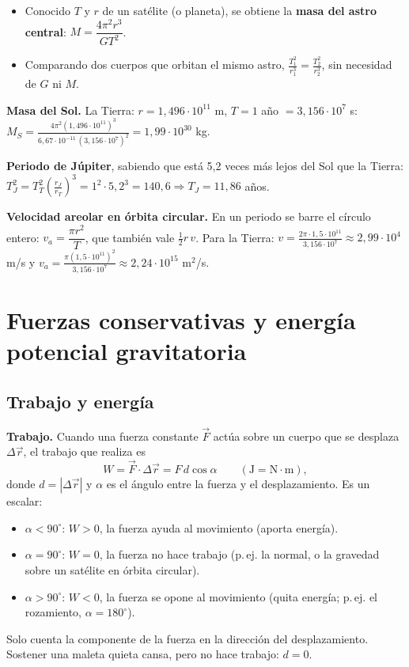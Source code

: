 \documentclass[11pt,a4paper]{article}
\begin{document}
\begin{clave}[title={Para qué sirve}]
\begin{itemize}[itemsep=1pt]
  \item Conocido $T$ y $r$ de un satélite (o planeta), se obtiene la \textbf{masa del astro central}: $M=\dfrac{4\pi^2r^3}{GT^2}$.
  \item Comparando dos cuerpos que orbitan el mismo astro, $\frac{T_1^2}{r_1^3}=\frac{T_2^2}{r_2^3}$, sin necesidad de $G$ ni $M$.
\end{itemize}
\end{clave}

\begin{ejemplo}[title={Ejemplos: masa del Sol y periodo de Júpiter}]
\textbf{Masa del Sol.} La Tierra: $r=1{,}496\cdot10^{11}$ m, $T=1$ año $=3{,}156\cdot10^7$ s:
$M_S=\frac{4\pi^2(1{,}496\cdot10^{11})^3}{6{,}67\cdot10^{-11}\,(3{,}156\cdot10^7)^2}=1{,}99\cdot10^{30}$ kg.

\textbf{Periodo de Júpiter}, sabiendo que está 5,2 veces más lejos del Sol que la Tierra:
$T_J^2=T_T^2\left(\frac{r_J}{r_T}\right)^3=1^2\cdot5{,}2^3=140{,}6\Rightarrow T_J=11{,}86$ años.
\end{ejemplo}

\textbf{Velocidad areolar en órbita circular.} En un periodo se barre el círculo entero: $v_a=\dfrac{\pi r^2}{T}$, que también vale $\frac12 r\,v$. Para la Tierra: $v=\frac{2\pi\cdot1{,}5\cdot10^{11}}{3{,}156\cdot10^7}\approx2{,}99\cdot10^4$ m/s y $v_a=\frac{\pi(1{,}5\cdot10^{11})^2}{3{,}156\cdot10^7}\approx2{,}24\cdot10^{15}$ m$^2$/s.

\section{Fuerzas conservativas y energía potencial gravitatoria}
\subsection{Trabajo y energía}
\textbf{Trabajo.} Cuando una fuerza constante $\vec F$ actúa sobre un cuerpo que se desplaza $\Delta\vec r$, el trabajo que realiza es
\[
W=\vec F\cdot\Delta\vec r=F\,d\cos\alpha\qquad(\mathrm{J}=\mathrm{N\cdot m}),
\]
donde $d=|\Delta\vec r|$ y $\alpha$ es el ángulo entre la fuerza y el desplazamiento. Es un escalar:
\begin{itemize}[itemsep=1pt]
  \item $\alpha<90^\circ$: $W>0$, la fuerza ayuda al movimiento (aporta energía).
  \item $\alpha=90^\circ$: $W=0$, la fuerza no hace trabajo (p.\,ej. la normal, o la gravedad sobre un satélite en órbita circular).
  \item $\alpha>90^\circ$: $W<0$, la fuerza se opone al movimiento (quita energía; p.\,ej. el rozamiento, $\alpha=180^\circ$).
\end{itemize}
Solo cuenta la componente de la fuerza en la dirección del desplazamiento. Sostener una maleta quieta cansa, pero no hace trabajo: $d=0$.
\end{document}
